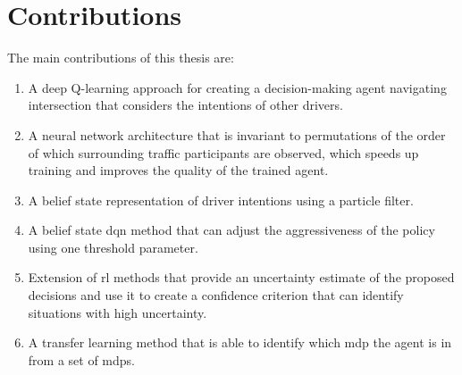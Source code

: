 \section{Contributions}
\label{sec:contributions}
The main contributions of this thesis are:
\begin{enumerate}
	\item A deep Q-learning approach for creating a decision-making agent navigating intersection that considers the intentions of other drivers. 
	\item A neural network architecture that is invariant to permutations of the order of which surrounding traffic participants are observed, which speeds up training and improves the quality of the trained agent. 
	\item A belief state representation of driver intentions using a particle filter.
	\item A belief state \gls{dqn} method that can adjust the aggressiveness of the policy using one threshold parameter.
	\item Extension of \gls{rl} methods that provide an uncertainty estimate of the proposed decisions and use it to create a confidence criterion that can identify situations with high uncertainty. 
	\item A transfer learning method that is able to identify which \gls{mdp} the agent is in from a set of \gls{mdp}s.
\end{enumerate}


